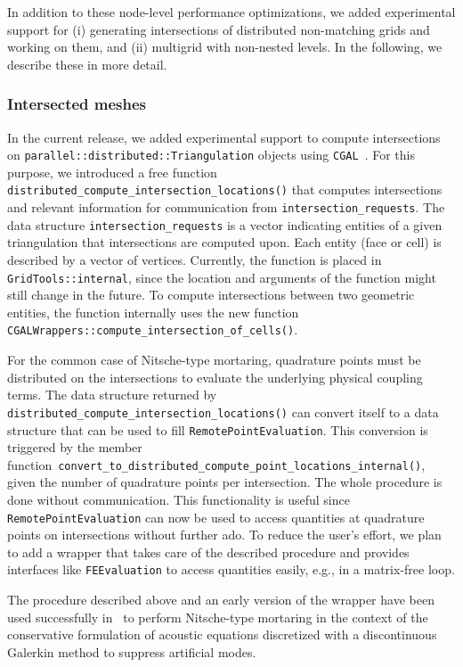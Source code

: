 \documentclass{ansarticle-preprint}
\begin{document}
In addition to these node-level performance optimizations, we added experimental
support for (i) generating intersections of distributed
non-matching grids and working on them,
and (ii) multigrid with non-nested levels. In the following, we describe these
in more detail.

\subsubsection{Intersected meshes}
In the current release, we added experimental support to compute intersections on \texttt{parallel::distributed::Triangulation} objects using \texttt{CGAL}~\cite{cgal-user-ref}.
For this purpose, we introduced a free function \texttt{distributed\_compute\_intersection\_locations()} that computes intersections and relevant information for communication from \texttt{intersection\_re\-quests}.
The data structure \texttt{intersection\_requests} is a vector indicating entities of a given triangulation that intersections are computed upon.
Each entity (face or cell) is described by a vector of vertices.
Currently, the function is placed in \texttt{GridTools::internal}, since the location and arguments of the function might still change in the future.
To compute intersections between two geometric entities, the function internally uses the new function \texttt{CGALWrappers::compute\_intersec\-tion\_of\_cells()}.

For the common case of Nitsche-type mortaring, quadrature points must be distributed on the intersections to evaluate the underlying physical coupling terms.
The data structure returned by \texttt{distributed\_compute\_intersection\_locations()} can convert itself to a data structure that can be used to fill \texttt{RemotePointEvaluation}.
This conversion is triggered by the member function~\texttt{convert\_to\_distributed\_compute\_point\_locations\_internal()}, given the number of quadrature points per intersection.
The whole procedure is done without communication.
%
This functionality is useful since \texttt{RemotePointEvaluation} can now be used to access quantities at quadrature points on intersections without further ado.
To reduce the user's effort, we plan to add a wrapper that takes care of the described procedure and provides interfaces like \texttt{FEEvaluation} to access quantities easily, e.g., in a matrix-free loop.

The procedure described above and an early version of the wrapper have
been used successfully in~\cite{heinz2023high} to perform Nitsche-type
mortaring in the context of the conservative formulation of acoustic
equations discretized with a discontinuous Galerkin method to suppress
artificial modes.
\end{document}
